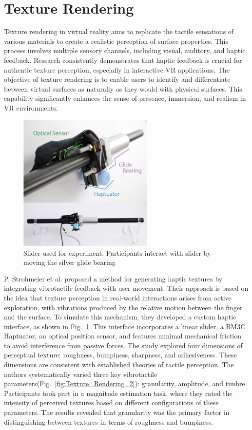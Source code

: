 \section{Texture Rendering}
Texture rendering in virtual reality aims to replicate the tactile sensations of various materials to create a realistic perception of surface properties. This process involves multiple sensory channels, including visual, auditory, and haptic feedback. Research consistently demonstrates that haptic feedback is crucial for authentic texture perception, especially in interactive VR applications. The objective of texture rendering is to enable users to identify and differentiate between virtual surfaces as naturally as they would with physical surfaces. This capability significantly enhances the sense of presence, immersion, and realism in VR environments.
\begin{figure}[H]\centering
	\includegraphics[width=0.6\textwidth]{Pictures/Texture_Rendering_1.png}%
	\caption{Slider used for experiment. Participants interact with slider by moving the silver glide bearing\cite{10.1145/3025453.3025812}}\label{fig:Texture_Rendering_1}%
\end{figure}

P. Strohmeier et al.\cite{10.1145/3025453.3025812} proposed a method for generating haptic textures by integrating vibrotactile feedback with user movement. Their approach is based on the idea that texture perception in real-world interactions arises from active exploration, with vibrations produced by the relative motion between the finger and the surface. To simulate this mechanism, they developed a custom haptic interface, as shown in Fig.~\ref{fig:Texture_Rendering_1}. This interface incorporates a linear slider, a BM3C Haptuator, an optical position sensor, and features minimal mechanical friction to avoid interference from passive forces.
The study explored four dimensions of perceptual texture: roughness, bumpiness, sharpness, and adhesiveness. These dimensions are consistent with established theories of tactile perception. The authors systematically varied three key vibrotactile parameters(Fig.~\ref{fig:Texture_Rendering_2}): granularity, amplitude, and timbre. Participants took part in a magnitude estimation task, where they rated the intensity of perceived textures based on different configurations of these parameters. The results revealed that granularity was the primary factor in distinguishing between textures in terms of roughness and bumpiness.

